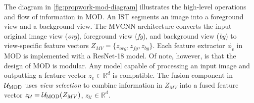 The diagram in \ref{fig:propwork-mod-diagram} illustrates the high-level operations and flow of information in MOD. An IST segments an image into a foreground view and a background view. The MVCNN architecture converts the input original image view (\textit{org}), foreground view (\textit{fg}), and background view (\textit{bg}) to view-specific feature vectors $Z_{MV} = \{z_{org}, z_{fg}, z_{bg}\}$. Each feature extractor $\phi_v$ in MOD is implemented with a ResNet-18 \cite{he2016deep} model. Of note, however, is that the design of MOD is modular. Any model capable of processing an input image and outputting a feature vector $z_v \in \mathbb{R}^d$ is compatible. The fusion component in \sysa $\mathcal{U}_{\text{MOD}}$ uses \emph{view selection} to combine information in $Z_{MV}$ into a fused feature vector $z_{\mathcal{U}} = \mathcal{U}_{\text{MOD}}(Z_{MV})$, $z_{\mathcal{U}} \in \mathbb{R}^d$.

